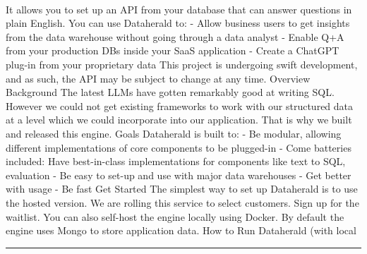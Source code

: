 \documentclass[10pt,a4paper]{article}
\begin{document}
\begin{multicols*}{2}
\paragraph{}
 It allows you to set up an API from your database that can answer questions in plain English. You can use Dataherald to:
- Allow business users to get insights from the data warehouse without going through a data analyst
- Enable Q+A from your production DBs inside your SaaS application
- Create a ChatGPT plug-in from your proprietary data
This project is undergoing swift development, and as such, the API may be subject to change at any time.
Overview
Background
The latest LLMs have gotten remarkably good at writing SQL. However we could not get existing frameworks to work with our structured data at a level which we could incorporate into our application. That is why we built and released this engine.
Goals
Dataherald is built to:
- Be modular, allowing different implementations of core components to be plugged-in
- Come batteries included: Have best-in-class implementations for components like text to SQL, evaluation
- Be easy to set-up and use with major data warehouses
- Get better with usage
- Be fast
Get Started
The simplest way to set up Dataherald is to use the hosted version. We are rolling this service to select customers. Sign up for the waitlist.
You can also self-host the engine locally using Docker. By default the engine uses Mongo to store application data.
How to Run Dataherald (with local
\par\noindent\textcolor{red}{\rule{\linewidth}{0.2mm}}
\vfill
\null
\noindent\begin{minipage}{\linewidth}

\end{minipage}
\end{multicols*}
\end{document}
